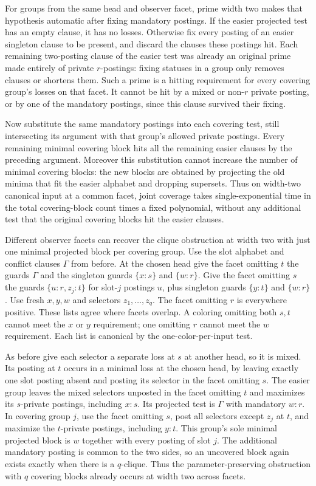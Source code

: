 For groups from the same head and observer facet,
prime width two makes that hypothesis automatic
after fixing mandatory postings. If the easier
projected test has an empty clause, it has no losses.
Otherwise fix every posting of an easier singleton
clause to be present, and discard the clauses these
postings hit. Each remaining two-posting clause of
the easier test was already an original prime made
entirely of private $r$-postings: fixing statuses
in a group only removes clauses or shortens them.
Such a prime is a hitting requirement for every
covering group's losses on that facet. It cannot
be hit by a mixed or non-$r$ private posting, or
by one of the mandatory postings, since this
clause survived their fixing.

Now substitute the same mandatory postings into
each covering test, still intersecting its argument
with that group's allowed private postings. Every
remaining minimal covering block hits all the
remaining easier clauses by the preceding argument.
Moreover this substitution cannot increase the
number of minimal covering blocks: the new blocks
are obtained by projecting the old minima that fit
the easier alphabet and dropping supersets. Thus
on width-two canonical input at a common facet,
joint coverage takes single-exponential time in
the total covering-block count times a fixed
polynomial, without any additional test that the
original covering blocks hit the easier clauses.

Different observer facets can recover the clique
obstruction at width two with just one minimal
projected block per covering group. Use the slot
alphabet and conflict clauses $\Gamma$ from before.
At the chosen head give the facet omitting $t$
the guards $\Gamma$ and the singleton guards
$\{x:s\}$ and $\{w:r\}$. Give the facet omitting
$s$ the guards $\{u:r,z_j:t\}$ for slot-$j$
postings $u$, plus singleton guards $\{y:t\}$
and $\{w:r\}$. Use fresh $x,y,w$ and selectors
$z_1,\ldots,z_q$. The facet omitting $r$ is
everywhere positive. These lists agree where
facets overlap. A coloring omitting both $s,t$
cannot meet the $x$ or $y$ requirement; one
omitting $r$ cannot meet the $w$ requirement.
Each list is canonical by the one-color-per-input
test.

As before give each selector a separate loss at
$s$ at another head, so it is mixed. Its posting
at $t$ occurs in a minimal loss at the chosen
head, by leaving exactly one slot posting absent
and posting its selector in the facet omitting $s$.
The easier group leaves the mixed selectors
unposted in the facet omitting $t$ and maximizes
its $s$-private postings, including $x:s$. Its
projected test is $\Gamma$ with mandatory $w:r$.
In covering group $j$, use the facet omitting
$s$, post all selectors except $z_j$ at $t$, and
maximize the $t$-private postings, including
$y:t$. This group's sole minimal projected block
is $w$ together with every posting of slot $j$.
The additional mandatory posting is common to
the two sides, so an uncovered block again exists
exactly when there is a $q$-clique. Thus the
parameter-preserving obstruction with $q$ covering
blocks already occurs at width two across facets.

